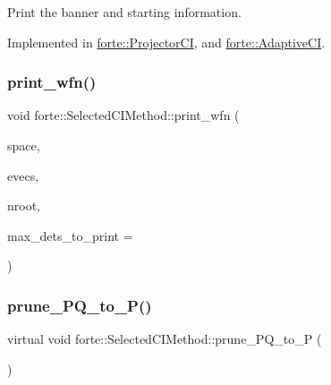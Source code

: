 Print the banner and starting information. 



Implemented in \mbox{\hyperlink{classforte_1_1_projector_c_i_a9ef4c662c6582ba4ec1a9ab9bd806b6e}{forte\+::\+Projector\+CI}}, and \mbox{\hyperlink{classforte_1_1_adaptive_c_i_a849ad578ee7ab5e78532a77df9b3ce9b}{forte\+::\+Adaptive\+CI}}.

\mbox{\label{classforte_1_1_selected_c_i_method_a178a959c5c09675cdd355bf3e08cedfe}} 
\subsubsection{\texorpdfstring{print\+\_\+wfn()}{print\_wfn()}}
{\footnotesize\ttfamily void forte\+::\+Selected\+C\+I\+Method\+::print\+\_\+wfn (\begin{DoxyParamCaption}\item[{\mbox{\hyperlink{classforte_1_1_determinant_hash_vec}{Determinant\+Hash\+Vec}} \&}]{space,  }\item[{std\+::shared\+\_\+ptr$<$ psi\+::\+Matrix $>$}]{evecs,  }\item[{int}]{nroot,  }\item[{size\+\_\+t}]{max\+\_\+dets\+\_\+to\+\_\+print = {} }\end{DoxyParamCaption})}

\mbox{\label{classforte_1_1_selected_c_i_method_a245f5fcd64ee44acf7b065981380f8dd}} 
\subsubsection{\texorpdfstring{prune\+\_\+\+P\+Q\+\_\+to\+\_\+\+P()}{prune\_PQ\_to\_P()}}
{\footnotesize\ttfamily virtual void forte\+::\+Selected\+C\+I\+Method\+::prune\+\_\+\+P\+Q\+\_\+to\+\_\+P (\begin{DoxyParamCaption}{ }\end{DoxyParamCaption})\hspace{0.3cm}{\ttfamily [pure virtual]}}



